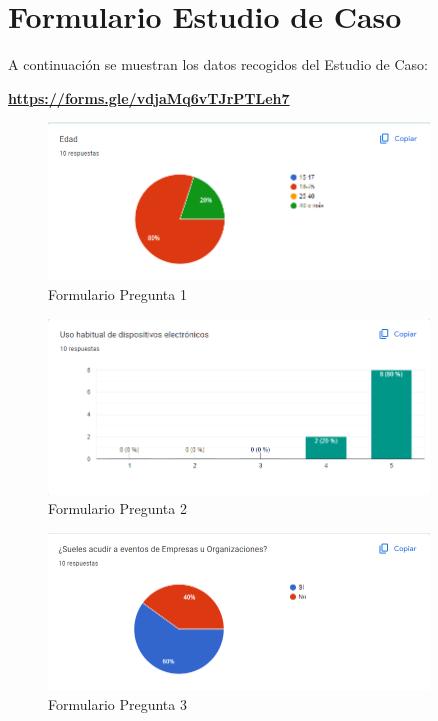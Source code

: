 \section{Formulario Estudio de Caso}
\label{sec:apen1}
A continuación se muestran los datos recogidos del Estudio de Caso: 

\textbf{\href{https://forms.gle/vdjaMq6vTJrPTLeh7}{https://forms.gle/vdjaMq6vTJrPTLeh7}}

\begin{figure}[h]
    \centering
    \includegraphics[width=0.9\textwidth]{Form1.png} 
    \caption{Formulario Pregunta 1}
    \label{fig:form1}
\end{figure}
\begin{figure}[h]
    \centering
    \includegraphics[width=0.9\textwidth]{Form2.png} 
    \caption{Formulario Pregunta 2}
    \label{fig:form2}
\end{figure} 
\begin{figure}[h]
    \centering
    \includegraphics[width=0.9\textwidth]{Form3.png} 
    \caption{Formulario Pregunta 3}
    \label{fig:form3}
\end{figure}
